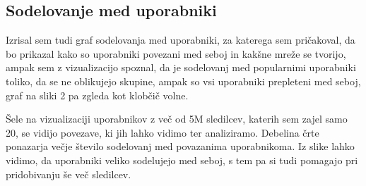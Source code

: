\documentclass[a4paper,11pt]{article}
\begin{document}
\subsection{Sodelovanje med uporabniki}

Izrisal sem tudi graf sodelovanja med uporabniki, za katerega sem pričakoval, da bo prikazal kako so uporabniki povezani med seboj in kakšne mreže se tvorijo, ampak sem z vizualizacijo spoznal, da je sodelovanj med popularnimi uporabniki toliko, da se ne oblikujejo skupine, ampak so vsi uporabniki prepleteni med seboj, graf na sliki 2 pa zgleda kot klobčič volne.
\par
Šele na vizualizaciji uporabnikov z več od 5M sledilcev, katerih sem zajel samo 20, se vidijo povezave, ki jih lahko vidimo ter analiziramo. Debelina črte ponazarja večje število sodelovanj med povazanima uporabnikoma. Iz slike lahko vidimo, da uporabniki veliko sodelujejo med seboj, s tem pa si tudi pomagajo pri pridobivanju še več sledilcev.
\end{document}
